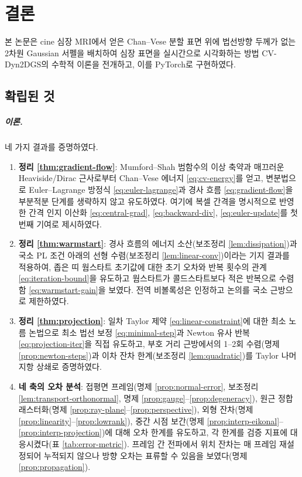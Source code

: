 \chapter{결론}
\label{ch:conclusion}

본 논문은 cine 심장 MRI에서 얻은 Chan--Vese 분할 표면 위에 법선방향 두께가 없는 2차원
Gaussian 서펠을 배치하여 심장 표면을 실시간으로 시각화하는 방법 CV-Dyn2DGS의 수학적
이론을 전개하고, 이를 PyTorch로 구현하였다.

\section{확립된 것}

\paragraph{이론.}
네 가지 결과를 증명하였다.

\begin{enumerate}[leftmargin=2em]
  \item \textbf{정리 \ref{thm:gradient-flow}}: Mumford--Shah 범함수의 이상 축약과 매끄러운
  Heaviside/Dirac 근사로부터 Chan--Vese 에너지 \eqref{eq:cv-energy}를 얻고, 변분법으로
  Euler--Lagrange 방정식 \eqref{eq:euler-lagrange}과 경사 흐름 \eqref{eq:gradient-flow}을
  부분적분 단계를 생략하지 않고 유도하였다. 여기에 복셀 간격을 명시적으로 반영한 간격
  인지 이산화 \eqref{eq:central-grad}, \eqref{eq:backward-div}, \eqref{eq:euler-update}를
  첫 번째 기여로 제시하였다.
  \item \textbf{정리 \ref{thm:warmstart}}: 경사 흐름의 에너지 소산(보조정리
  \ref{lem:dissipation})과 국소 PL 조건 아래의 선형 수렴(보조정리
  \ref{lem:linear-conv})이라는 기지 결과를 적용하여, 좁은 띠 웜스타트 초기값에 대한
  초기 오차와 반복 횟수의 관계 \eqref{eq:iteration-bound}을 유도하고 웜스타트가
  콜드스타트보다 적은 반복으로 수렴함 \eqref{eq:warmstart-gain}을 보였다. 전역
  비볼록성은 인정하고 논의를 국소 근방으로 제한하였다.
  \item \textbf{정리 \ref{thm:projection}}: 일차 Taylor 제약 \eqref{eq:linear-constraint}에
  대한 최소 노름 논법으로 최소 법선 보정 \eqref{eq:minimal-step}과 Newton 유사 반복
  \eqref{eq:projection-iter}을 직접 유도하고, 부호 거리 근방에서의 1--2회 수렴(명제
  \ref{prop:newton-steps})과 이차 잔차 한계(보조정리 \ref{lem:quadratic})를 Taylor
  나머지항 상쇄로 증명하였다.
  \item \textbf{네 축의 오차 분석}: 접평면 프레임(명제 \ref{prop:normal-error},
  보조정리 \ref{lem:transport-orthonormal}, 명제 \ref{prop:gauge}--\ref{prop:degeneracy}),
  원근 정합 래스터화(명제 \ref{prop:ray-plane}--\ref{prop:perspective}), 외형 잔차(명제
  \ref{prop:linearity}--\ref{prop:lowrank}), 중간 시점 보간(명제
  \ref{prop:interp-eikonal}--\ref{prop:interp-projection})에 대해 오차 한계를 유도하고,
  각 한계를 검증 지표에 대응시켰다(표 \ref{tab:error-metric}). 프레임 간 전파에서 위치
  잔차는 매 프레임 재설정되어 누적되지 않으나 방향 오차는 표류할 수 있음을 보였다(명제
  \ref{prop:propagation}).
\end{enumerate}

